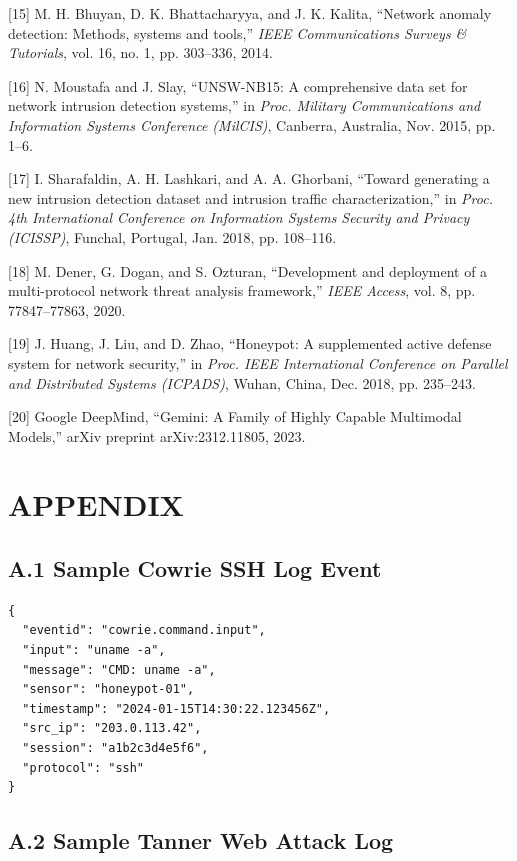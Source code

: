 \documentclass[12pt,a4paper]{report}
\begin{document}
[15] M. H. Bhuyan, D. K. Bhattacharyya, and J. K. Kalita, ``Network anomaly detection: Methods, systems and tools,'' \textit{IEEE Communications Surveys \& Tutorials}, vol. 16, no. 1, pp. 303--336, 2014.

[16] N. Moustafa and J. Slay, ``UNSW-NB15: A comprehensive data set for network intrusion detection systems,'' in \textit{Proc. Military Communications and Information Systems Conference (MilCIS)}, Canberra, Australia, Nov. 2015, pp. 1--6.

[17] I. Sharafaldin, A. H. Lashkari, and A. A. Ghorbani, ``Toward generating a new intrusion detection dataset and intrusion traffic characterization,'' in \textit{Proc. 4th International Conference on Information Systems Security and Privacy (ICISSP)}, Funchal, Portugal, Jan. 2018, pp. 108--116.

[18] M. Dener, G. Dogan, and S. Ozturan, ``Development and deployment of a multi-protocol network threat analysis framework,'' \textit{IEEE Access}, vol. 8, pp. 77847--77863, 2020.

[19] J. Huang, J. Liu, and D. Zhao, ``Honeypot: A supplemented active defense system for network security,'' in \textit{Proc. IEEE International Conference on Parallel and Distributed Systems (ICPADS)}, Wuhan, China, Dec. 2018, pp. 235--243.

[20] Google DeepMind, ``Gemini: A Family of Highly Capable Multimodal Models,'' arXiv preprint arXiv:2312.11805, 2023.


\chapter*{APPENDIX}
\thispagestyle{plain}

\section*{A.1 Sample Cowrie SSH Log Event}

\begin{lstlisting}[caption=Cowrie JSON Log Sample]
{
  "eventid": "cowrie.command.input",
  "input": "uname -a",
  "message": "CMD: uname -a",
  "sensor": "honeypot-01",
  "timestamp": "2024-01-15T14:30:22.123456Z",
  "src_ip": "203.0.113.42",
  "session": "a1b2c3d4e5f6",
  "protocol": "ssh"
}
\end{lstlisting}

\section*{A.2 Sample Tanner Web Attack Log}
\end{document}
